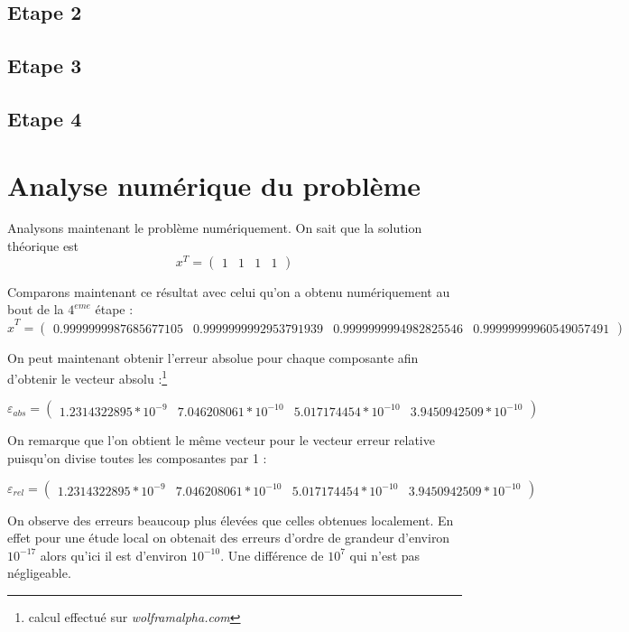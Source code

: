 \documentclass[12,french]{report}
\begin{document}
\section{Etape 2}

\section{Etape 3}

\section{Etape 4}

\chapter{Analyse numérique du problème} %

Analysons maintenant le problème numériquement. On sait que la solution théorique est
$$x^T=\left(\begin{array}{cccc}
1 & 1 & 1 & 1\end{array}\right)$$

Comparons maintenant ce résultat avec celui qu'on a obtenu numériquement au bout de la $4^{eme}$ étape :
$$\hat{x}^T=\left(\begin{array}{cccc}
0.9999999987685677105 & 0.9999999992953791939 & 0.9999999994982825546 & 0.99999999960549057491\end{array}\right)$$\vspace{0cm}

On peut maintenant obtenir l'erreur absolue pour chaque composante afin d'obtenir le vecteur absolu :\footnote{calcul effectué sur \textit{wolframalpha.com}}

$$\varepsilon_{abs}=\left(\begin{array}{cccc}
1.2314322895*10^{-9} & 7.046208061*10^{-10} & 5.017174454*10^{-10} & 3.9450942509*10^{-10} \end{array}\right)$$\vspace{0cm}

On remarque que l'on obtient le même vecteur pour le vecteur erreur relative puisqu'on divise toutes les composantes par 1 :

$$\varepsilon_{rel}=\left(\begin{array}{cccc}
1.2314322895*10^{-9} & 7.046208061*10^{-10} & 5.017174454*10^{-10} & 3.9450942509*10^{-10} \end{array}\right)$$

On observe des erreurs beaucoup plus élevées que celles obtenues localement. En effet pour une étude local on obtenait des erreurs d'ordre de grandeur d'environ $10^{-17}$ alors qu'ici il est d'environ $10^{-10}$. Une différence de $10^{7}$ qui n'est pas négligeable.\\
\end{document}
